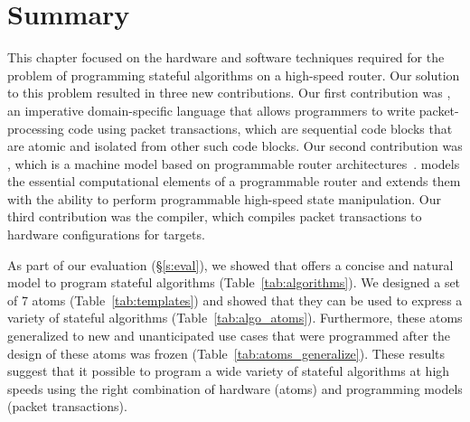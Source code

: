\section{Summary}
\label{s:domino_summary}

This chapter focused on the hardware and software techniques required for the
problem of programming stateful algorithms on a high-speed router. Our solution
to this problem resulted in three new contributions. Our first contribution was
\pktlanguage, an imperative domain-specific language that allows programmers to
write packet-processing code using packet transactions, which are sequential
code blocks that are atomic and isolated from other such code blocks.  Our
second contribution was \absmachine, which is a machine model based on
programmable router architectures~\cite{flexpipe, xpliant, tofino}.
\absmachine models the essential computational elements of a programmable
router and extends them with the ability to perform programmable high-speed
state manipulation. Our third contribution was the \pktlanguage compiler, which
compiles packet transactions to hardware configurations for \absmachine
targets.

As part of our evaluation (\S\ref{s:eval}), we showed that \pktlanguage offers
a concise and natural model to program stateful algorithms
(Table~\ref{tab:algorithms}). We designed a set of 7 atoms
(Table~\ref{tab:templates}) and showed that they can be used to express a
variety of stateful algorithms (Table~\ref{tab:algo_atoms}). Furthermore, these
atoms generalized to new and unanticipated use cases that were programmed after
the design of these atoms was frozen (Table~\ref{tab:atoms_generalize}). These
results suggest that it possible to program a wide variety of stateful
algorithms at high speeds using the right combination of hardware (atoms) and
programming models (packet transactions).
